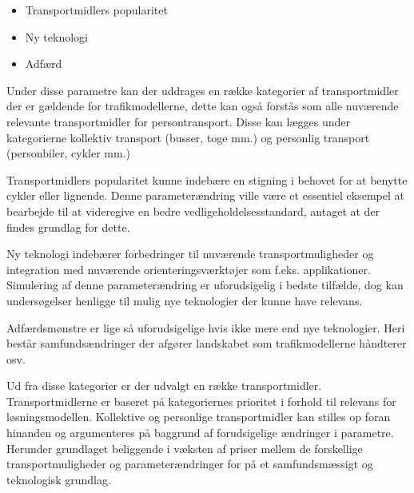 \begin{itemize}
\item Transportmidlers popularitet
\item Ny teknologi
\item Adfærd
\end{itemize}

Under disse parametre kan der uddrages en række kategorier af transportmidler der er gældende for trafikmodellerne, dette kan også forstås som alle nuværende relevante transportmidler for persontransport. Disse kan lægges under kategorierne kollektiv transport (busser, toge mm.) og personlig transport (personbiler, cykler mm.)

\vspace{5mm}

Transportmidlers popularitet kunne indebære en stigning i behovet for at benytte cykler eller lignende. Denne parameterændring ville være et essentiel eksempel at bearbejde til at videregive en bedre vedligeholdelsesstandard, antaget at der findes grundlag for dette.

\vspace{5mm}

Ny teknologi indebærer forbedringer til nuværende transportmuligheder og integration med nuværende orienteringsværktøjer som f.eks. applikationer. Simulering af denne parameterændring er uforudsigelig i bedste tilfælde, dog kan undersøgelser henligge til mulig nye teknologier der kunne have relevans.

\vspace{5mm}

Adfærdsmønstre er lige så uforudsigelige hvis ikke mere end nye teknologier. Heri består samfundsændringer der afgører landskabet som trafikmodellerne håndterer osv.

\vspace{5mm}

Ud fra disse kategorier er der udvalgt en række transportmidler. Transportmidlerne er baseret på kategoriernes prioritet i forhold til relevans for løsningsmodellen. Kollektive og personlige transportmidler kan stilles op foran hinanden og argumenteres på baggrund af forudsigelige ændringer i parametre. Herunder grundlaget beliggende i væksten af priser mellem de forskellige transportmuligheder og parameterændringer for på et samfundsmæssigt og teknologisk grundlag.